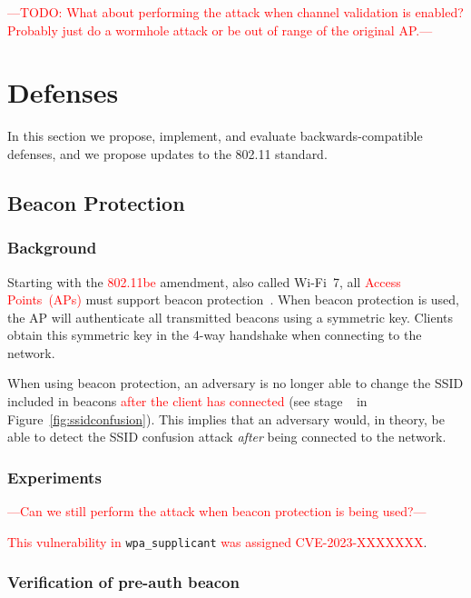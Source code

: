 \documentclass[sigconf,review]{acmart}
\newcommand{\circlenum}[1]{\textcircled{\raisebox{-0.90pt}{#1}}}
\newcommand{\wifi}{\mbox{Wi-Fi}}
\newcommand{\fourway}{\mbox{4-way}}
\DeclareRobustCommand{\red}[1]{\textcolor{red}{#1}}
\begin{document}
\red{---TODO: What about performing the attack when channel validation is enabled? Probably just do a wormhole attack or be out of range of the original AP.---}

\section{Defenses}
\label{sec:defenses}

In this section we propose, implement, and evaluate backwards-compatible defenses, and we propose updates to the 802.11 standard.

\subsection{Beacon Protection}

\subsubsection{Background}

Starting with the \red{802.11be} amendment, also called \wifi{}~7, all \red{Access Points~(APs)} must support beacon protection~\cite{ieee-mentor-mandate-beaconprot}.
When beacon protection is used, the AP will authenticate all transmitted beacons using a symmetric key.
Clients obtain this symmetric key in the \fourway{} handshake when connecting to the network.

When using beacon protection, an adversary is no longer able to change the SSID included in beacons \red{after the client has connected} (see stage~\circlenum{3} in Figure~\ref{fig:ssidconfusion}).
This implies that an adversary would, in theory, be able to detect the SSID confusion attack \emph{after} being connected to the network.

\subsubsection{Experiments}

\red{---Can we still perform the attack when beacon protection is being used?---}

\red{This vulnerability in} \verb|wpa_supplicant| \red{was assigned CVE-2023-XXXXXXX}.

\subsubsection{Verification of pre-auth beacon}
\end{document}
